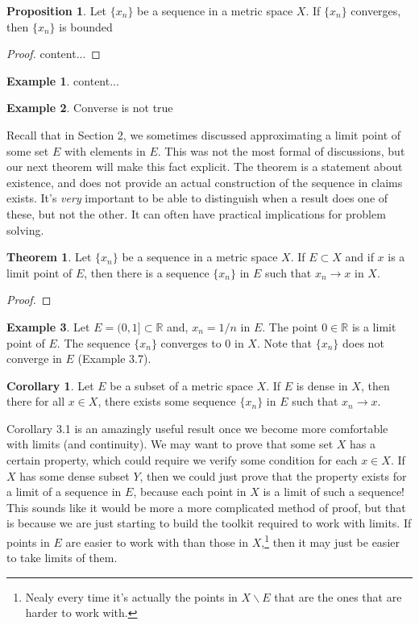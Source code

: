 \documentclass{article}
\newcommand{\R}{\mathbb{R}}
\theoremstyle{definition}
\newtheorem{proposition}{Proposition}[section]
\newtheorem{theorem}{Theorem}[section]
\newtheorem{corollary}{Corollary}[section]
\newtheorem{example}{Example}[section]
\begin{document}
\begin{proposition}
	Let $ \{x_n\} $ be a sequence in a metric space $ X $. If $ \{x_n\} $ converges, then $ \{x_n\} $ is bounded
\end{proposition}
\begin{proof}
	content...
\end{proof}
\begin{example}
	content...
\end{example}
\begin{example}
	Converse is not true
\end{example}
Recall that in Section 2, we sometimes discussed approximating a limit point of some set $ E $ with elements in $ E $. This was not the most formal of discussions, but our next theorem will make this fact explicit. The theorem is a statement about existence, and does not provide an actual construction of the sequence in claims exists. It's \textit{very} important to be able to distinguish when a result does one of these, but not the other. It can often have practical implications for problem solving. 
\begin{theorem}
	Let $ \{x_n\} $ be a sequence in a metric space $ X $. If $ E\subset X $ and if $ x $ is a limit point of $ E $, then there is a sequence $ \{x_n\} $ in $ E $ such that $ x_n\to x $ in $ X $. 
\end{theorem}
\begin{proof}
\end{proof}
\begin{example}
	Let $ E=(0,1]\subset\R $ and, $ x_n=1/n $ in $ E $. The point $ 0\in\R $ is a limit point of $ E $. The sequence $ \{x_n\} $ converges to $ 0 $ in $ X $. Note that $ \{x_n\} $ does not converge in $ E $ (Example 3.7).   
\end{example}
\begin{corollary}
	Let $ E $ be a subset of a metric space $ X $. If $ E $ is dense in $ X $, then there for all $ x\in X $, there exists some sequence $ \{x_n\} $ in $ E $ such that $ x_n\to x $. 
\end{corollary}
Corollary 3.1 is an amazingly useful result once we become more comfortable with limits (and continuity). We may want to prove that some set $ X $ has a certain property, which could require we verify some condition for each $ x\in X $. If $ X $ has some dense subset $ Y $, then we could just prove that the property exists for a limit of a sequence in $ E $, because each point in $ X $ is a limit of such a sequence! This sounds like it would be more a more complicated method of proof, but that is because we are just starting to build the toolkit required to work with limits. If points in $ E $ are easier to work with than those in $ X $,\footnote{Nealy every time it's actually the points in $ X\backslash E $ that are the ones that are harder to work with.} then it may just be easier to take limits of them. 
\end{document}
